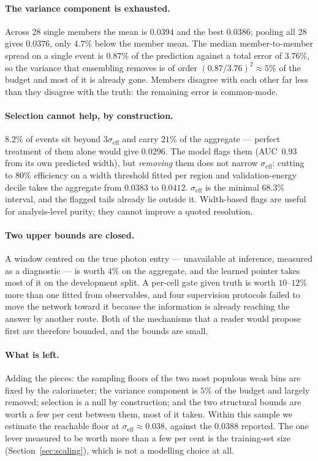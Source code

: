 \documentclass[11pt,a4paper]{article}
\newcommand{\seff}{\ensuremath{\sigma_{\mathrm{eff}}}}
\begin{document}
\paragraph{The variance component is exhausted.} Across 28 single members the
mean is $0.0394$ and the best $0.0386$; pooling all 28 gives $0.0376$, only
$4.7\%$ below the member mean. The median member-to-member spread on a single
event is $0.87\%$ of the prediction against a total error of $3.76\%$, so the
variance that ensembling removes is of order $(0.87/3.76)^2 \approx 5\%$ of the
budget and most of it is already gone. Members disagree with each other far
less than they disagree with the truth: the remaining error is common-mode.

\paragraph{Selection cannot help, by construction.} $8.2\%$ of events sit
beyond $3\seff$ and carry $21\%$ of the aggregate --- perfect treatment of them
alone would give $0.0296$. The model flags them (AUC~$0.93$ from its own
predicted width), but \emph{removing} them does not narrow \seff{}: cutting to
$80\%$ efficiency on a width threshold fitted per region and validation-energy
decile takes the aggregate from $0.0383$ to $0.0412$. \seff{} is the minimal
$68.3\%$ interval, and the flagged tails already lie outside it. Width-based
flags are useful for analysis-level purity; they cannot improve a quoted
resolution.

\paragraph{Two upper bounds are closed.} A window centred on the true photon
entry --- unavailable at inference, measured as a diagnostic --- is worth $4\%$
on the aggregate, and the learned pointer takes most of it on the development
split. A per-cell gate given truth is worth $10$--$12\%$ more than one fitted
from observables, and four supervision protocols failed to move the network
toward it because the information is already reaching the answer by another
route. Both of the mechanisms that a reader would propose first are therefore
bounded, and the bounds are small.

\paragraph{What is left.} Adding the pieces: the sampling floors of the two
most populous weak bins are fixed by the calorimeter; the variance component is
$5\%$ of the budget and largely removed; selection is a null by construction;
and the two structural bounds are worth a few per cent between them, most of it
taken. Within this sample we estimate the reachable floor at
$\seff \approx 0.038$, against the $0.0388$ reported. The one lever measured to
be worth more than a few per cent is the training-set size
(Section~\ref{sec:scaling}), which is not a modelling choice at all.
\end{document}
